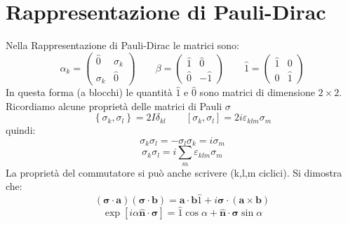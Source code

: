 \section{Rappresentazione di Pauli-Dirac}
Nella Rappresentazione di Pauli-Dirac le matrici sono:
\begin{equation*}
    \alpha_k = \begin{pmatrix} \hat{0} & \sigma_k \\ \sigma_k & \hat{0} \end{pmatrix} \qquad \beta = \begin{pmatrix} \hat{1} & \hat{0} \\ \hat{0} & -\hat{1} \end{pmatrix} \qquad \hat{1} = \begin{pmatrix} \hat{1} & 0 \\ 0 & \hat{1} \end{pmatrix}
\end{equation*}
In questa forma (a blocchi) le quantità $\hat{1}$ e $\hat{0}$ sono matrici di dimensione $2\times 2$. Ricordiamo alcune proprietà delle matrici di Pauli $\sigma$
\begin{equation*}
    \left\{\sigma_k,\sigma_l \right\}=2I\delta_{kl} \qquad \left[\sigma_k,\sigma_l\right]=2i\varepsilon_{klm}\sigma_m
\end{equation*}
quindi:
\begin{equation*}
    \sigma_k\sigma_l=-\sigma_l\sigma_k=i\sigma_m
\end{equation*}
\begin{equation*}
    \sigma_k\sigma_l=i\sum_m\varepsilon_{klm}\sigma_m
\end{equation*}
La proprietà del commutatore si può anche scrivere (k,l,m ciclici).
Si dimostra che:
\begin{equation*}
    \left(\boldsymbol{\sigma}\cdot\mathbf{a}\right)\left(\boldsymbol{\sigma}\cdot\mathbf{b}\right)=\mathbf{a}\cdot\mathbf{b}\hat{1}+i\boldsymbol{\sigma}\cdot\left(\mathbf{a}\times\mathbf{b}\right)
\end{equation*}
\begin{equation*}
    \exp{\left[i\alpha\hat{\mathbf{n}}\cdot\boldsymbol{\sigma}\right]}=\hat{1}\cos{\alpha}+\hat{\mathbf{n}}\cdot\boldsymbol{\sigma}\sin{\alpha}
\end{equation*}
